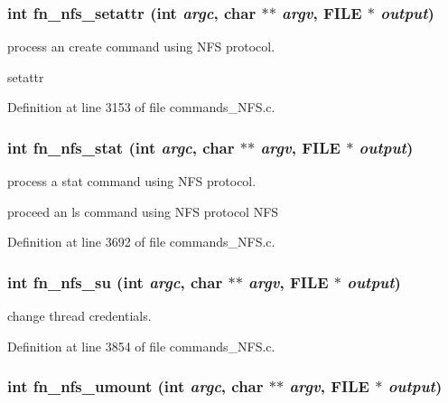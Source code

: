 \subsubsection[{fn\_\-nfs\_\-setattr}]{\setlength{\rightskip}{0pt plus 5cm}int fn\_\-nfs\_\-setattr (int {\em argc}, \/  char $\ast$$\ast$ {\em argv}, \/  FILE $\ast$ {\em output})}\label{commands_8h_ca7fba47173c3eac4e4d16f13a439533}


process an create command using NFS protocol.

setattr 

Definition at line 3153 of file commands\_\-NFS.c.
\subsubsection[{fn\_\-nfs\_\-stat}]{\setlength{\rightskip}{0pt plus 5cm}int fn\_\-nfs\_\-stat (int {\em argc}, \/  char $\ast$$\ast$ {\em argv}, \/  FILE $\ast$ {\em output})}\label{commands_8h_60d880fc087d6b800b305eef1518532b}


process a stat command using NFS protocol.

proceed an ls command using NFS protocol NFS 

Definition at line 3692 of file commands\_\-NFS.c.
\subsubsection[{fn\_\-nfs\_\-su}]{\setlength{\rightskip}{0pt plus 5cm}int fn\_\-nfs\_\-su (int {\em argc}, \/  char $\ast$$\ast$ {\em argv}, \/  FILE $\ast$ {\em output})}\label{commands_8h_467b8bbb73091f0399b2f9d15a2de9d5}


change thread credentials. 

Definition at line 3854 of file commands\_\-NFS.c.
\subsubsection[{fn\_\-nfs\_\-umount}]{\setlength{\rightskip}{0pt plus 5cm}int fn\_\-nfs\_\-umount (int {\em argc}, \/  char $\ast$$\ast$ {\em argv}, \/  FILE $\ast$ {\em output})}\label{commands_8h_d3705a7ae5f94ea44dc6ad4da82a38e7}


